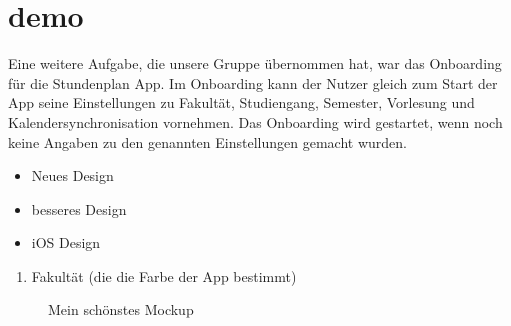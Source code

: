 \section{demo}
Eine weitere Aufgabe, die unsere Gruppe übernommen hat, war das Onboarding für die Stundenplan App. Im Onboarding kann der Nutzer gleich zum Start der App seine Einstellungen zu Fakultät, Studiengang, Semester, Vorlesung und Kalendersynchronisation vornehmen. Das Onboarding wird gestartet, wenn noch keine Angaben zu den genannten Einstellungen gemacht wurden.

\begin{itemize}
\item Neues Design
\item besseres Design
\item iOS Design
\end{itemize}

\begin{enumerate}
\item Fakultät (die die Farbe der App bestimmt)
\end{enumerate}

\begin{figure}[ht]
	\centering
	\caption{Mein schönstes Mockup}
	\label{fig2}
\end{figure}

